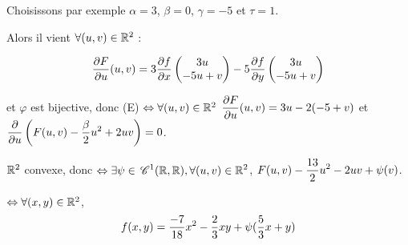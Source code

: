 \begin{exemple}
    \svspace Choisissons par exemple $\alpha = 3$, $\beta = 0$, $\gamma = -5$ et $\tau = 1$.

    \avspace Alors il vient $\forall (u, v) \in \mathbb{R}^2$ :

    $$\displaystyle \frac{\partial F}{\partial u} (u, v) = 3 \frac{\partial f}{\partial x} \begin{pmatrix}
        3 u \\
        -5 u + v
    \end{pmatrix} - 5 \frac{\partial f}{\partial y} \begin{pmatrix}
        3 u \\
        -5 u + v
    \end{pmatrix}$$

    et $\varphi$ est bijective, donc (E) $\Leftrightarrow \forall (u, v) \in \mathbb{R}^2$
    $\displaystyle \frac{\partial F}{\partial u} (u, v) = 3 u - 2 (-5 + v)$ et $\displaystyle \frac{\partial }{\partial u} \left( F(u, v) - \frac \beta 2 u^2 + 2 uv \right) = 0$.

    $\mathbb{R}^2$ convexe, donc $\displaystyle \Leftrightarrow \exists \psi \in \,\mathscr C^{1} (\mathbb{R}, \mathbb{R}), \forall (u, v) \in \mathbb{R}^2$,
    $\displaystyle F(u, v) - \frac {13} 2 u^2 - 2uv + \psi(v)$. 

    $\Leftrightarrow \forall (x, y) \in \mathbb{R}^2$,
    $$\displaystyle f(x, y) = \frac{-7}{18} x^2 - \frac 2 3 x y + \psi(\frac 5 3 x + y)$$
\end{exemple}



